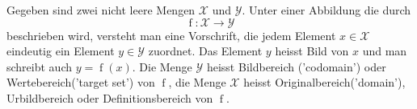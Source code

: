 Gegeben sind zwei nicht leere Mengen $\mathcal{X}$ und $\mathcal{Y}$. Unter einer Abbildung die durch 
$$\operatorname{f} : \mathcal{X} \to \mathcal{Y}$$ 
beschrieben wird, versteht man eine Vorschrift, die jedem Element $x \in \mathcal{X}$ eindeutig ein Element $y \in \mathcal{Y}$ zuordnet.  Das Element $y$ heisst Bild von $x$ und man schreibt auch $y = \operatorname{f}(x)$.  Die Menge $\mathcal{Y}$ heisst Bildbereich ('codomain') oder Wertebereich('target set') von $\operatorname{f}$, die Menge $\mathcal{X}$ heisst Originalbereich('domain'), Urbildbereich oder Definitionsbereich von $\operatorname{f}$.  

